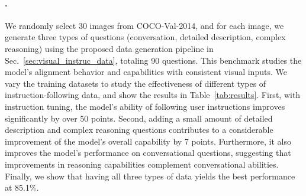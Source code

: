 \begin{table}[t!]
\centering
{}
\vspace{1mm}
\caption{Instruction-following capability comparison using relative scores on \benchwild{}. The results are reported in the format of \emph{mean} $\pm$ \emph{std}. For the first three rows, we report three inference runs. \shortname{} performs significantly better than others.  $^\dagger$ For a given set of \shortname{} decoding sequences, we evaluate by querying GPT-4 three times; GPT-4 gives a consistent evaluation.}
\vspace{-6mm}
\label{tab:results_wild}
\end{table}

\paragraph{\benchcoco{}.}
We randomly select 30 images from COCO-Val-2014, and for each image, we generate three types of questions (conversation, detailed description, complex reasoning) using the proposed data generation pipeline in Sec.~\ref{sec:visual_instruc_data}, totaling 90 questions. This benchmark studies the model's alignment behavior and capabilities with consistent visual inputs.
We vary the training datasets to study the effectiveness of different types of instruction-following data, and show the results in Table~\ref{tab:results}.  First, with instruction tuning, the model's ability of following user instructions improves significantly by over 50 points.  Second, adding a small amount of detailed description and complex reasoning questions contributes to a considerable improvement of the model's overall capability by 7 points. Furthermore, it also improves the model's performance on conversational questions, suggesting that improvements in reasoning capabilities complement conversational abilities.  Finally, we show that having all three types of data yields the best performance at 85.1\%.


